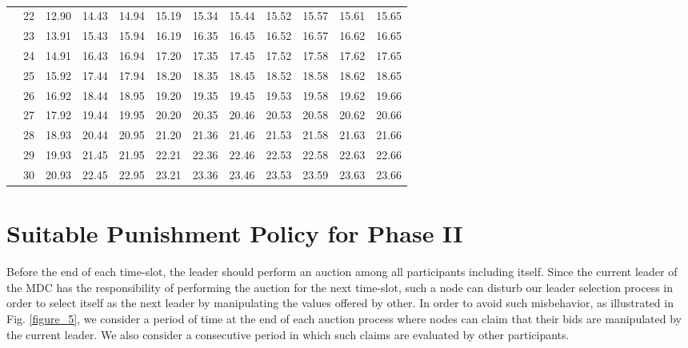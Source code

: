 \documentclass[journal,12pt, onecolumn]{IEEEtran}
\begin{document}
\begin{table*}[b]
\begin{center}
\begin{tabular}{ cc||c|c|c|c|c|c|c|c|c|c||}
\multicolumn{1}{||c|}{}
& 22 &    12.90 &    14.43 &    14.94 &    15.19 &    15.34 &    15.44 &    15.52 &    15.57 &    15.61 &    15.65 \\ 
\multicolumn{1}{||c|}{}
& 23 &    13.91 &    15.43 &    15.94 &    16.19 &    16.35 &    16.45 &    16.52 &    16.57 &    16.62 &    16.65 \\ 
\multicolumn{1}{||c|}{}
& 24 &    14.91 &    16.43 &    16.94 &    17.20 &    17.35 &    17.45 &    17.52 &    17.58 &    17.62 &    17.65 \\ 
\multicolumn{1}{||c|}{}
& 25 &    15.92 &    17.44 &    17.94 &    18.20 &    18.35 &    18.45 &    18.52 &    18.58 &    18.62 &    18.65 \\ 
\multicolumn{1}{||c|}{}
& 26 &    16.92 &    18.44 &    18.95 &    19.20 &    19.35 &    19.45 &    19.53 &    19.58 &    19.62 &    19.66 \\ 
\multicolumn{1}{||c|}{}
& 27 &    17.92 &    19.44 &    19.95 &    20.20 &    20.35 &    20.46 &    20.53 &    20.58 &    20.62 &    20.66 \\ 
\multicolumn{1}{||c|}{}
& 28 &    18.93 &    20.44 &    20.95 &    21.20 &    21.36 &    21.46 &    21.53 &    21.58 &    21.63 &    21.66 \\ 
\multicolumn{1}{||c|}{}
& 29 &    19.93 &    21.45 &    21.95 &    22.21 &    22.36 &    22.46 &    22.53 &    22.58 &    22.63 &    22.66 \\ 
\multicolumn{1}{||c|}{}
& 30 &    20.93 &    22.45 &    22.95 &    23.21 &    23.36 &    23.46 &    23.53 &    23.59 &    23.63 &    23.66 \\ 
\hline
\end{tabular}
\end{center}
\caption{}
\label{Energy_table}
\end{table*}

\section{Suitable Punishment Policy for Phase II}
\label{punishment}
Before the end of each time-slot, the leader should perform an auction among all participants including itself. Since the current leader of the MDC has the responsibility of performing the auction for the next time-slot, such a node can disturb our leader selection process in order to select itself as the next leader by manipulating the values offered by other. In order to avoid such misbehavior, as illustrated in Fig. \ref{figure_5}, we consider a period of time at the end of each auction process where nodes can claim that their bids are manipulated by the current leader. We also consider a consecutive period in which such claims are evaluated by other participants. 
\end{document}
